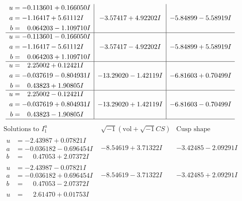 \documentclass[1p]{elsarticle_modified}
\theoremstyle{definition}
\newcommand{\I}{\sqrt{-1}}
\begin{document}
$$\begin{array}{c|c|c}
\begin{aligned}
u &= -0.113601 + 0.166050 I \\
a &= -1.16417 + 5.61112 I \\
b &= \phantom{-}0.064203 - 1.109710 I\end{aligned}
 & -3.57417 + 4.92202 I & -5.84899 - 5.58919 I \\ \hline\begin{aligned}
u &= -0.113601 - 0.166050 I \\
a &= -1.16417 - 5.61112 I \\
b &= \phantom{-}0.064203 + 1.109710 I\end{aligned}
 & -3.57417 - 4.92202 I & -5.84899 + 5.58919 I \\ \hline\begin{aligned}
u &= \phantom{-}2.25002 + 0.12421 I \\
a &= -0.037619 - 0.804931 I \\
b &= \phantom{-}0.43823 + 1.90805 I\end{aligned}
 & -13.29020 - 1.42119 I & -6.81603 + 0.70499 I \\ \hline\begin{aligned}
u &= \phantom{-}2.25002 - 0.12421 I \\
a &= -0.037619 + 0.804931 I \\
b &= \phantom{-}0.43823 - 1.90805 I\end{aligned}
 & -13.29020 + 1.42119 I & -6.81603 - 0.70499 I\\
 \hline 
 \end{array}$$\newpage$$\begin{array}{c|c|c}  
\text{Solutions to }I^u_{1}& \I (\text{vol} + \sqrt{-1}CS) & \text{Cusp shape}\\
 \hline 
\begin{aligned}
u &= -2.43987 + 0.07821 I \\
a &= -0.036182 - 0.696454 I \\
b &= \phantom{-}0.47053 + 2.07372 I\end{aligned}
 & -8.54619 + 3.71322 I & -3.42485 - 2.09291 I \\ \hline\begin{aligned}
u &= -2.43987 - 0.07821 I \\
a &= -0.036182 + 0.696454 I \\
b &= \phantom{-}0.47053 - 2.07372 I\end{aligned}
 & -8.54619 - 3.71322 I & -3.42485 + 2.09291 I \\ \hline\begin{aligned}
u &= \phantom{-}2.61470 + 0.01753 I \\

\end{aligned}
\end{array}$$
\end{document}

